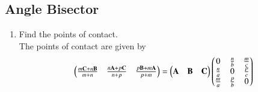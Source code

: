 		\subsection{Angle Bisector}
\begin{enumerate}[label=\thesubsection.\arabic*.,ref=\thesubsection.\theenumi]
\item Find the points of contact.
	\\
		\solution The points of contact are given by 
		\begin{align}
			\begin{pmatrix}			
						\frac{m\mathbf{C}+n\mathbf{B}}{m+n}
			&
			\frac{n\mathbf{A}+p\mathbf{C}}{n+p}
			&
						\frac{p\mathbf{B}+m\mathbf{A}}{p+m}
			\end{pmatrix}
			= 	\begin{pmatrix}\mathbf{A} & \mathbf{B} &\mathbf{C}\end{pmatrix}
			\begin{pmatrix}
				0 &			\frac{n}{b} & \frac{m}{c}  
				\\
			 \frac{n}{a}& 0 & \frac{p}{c} 
				\\
			\frac{m}{a}	&		\frac{p}{b} & 0  
			\end{pmatrix}
		\end{align}
\end{enumerate}
